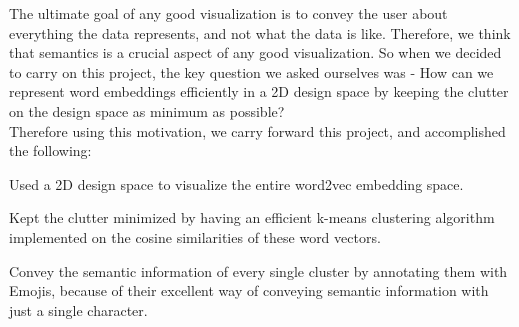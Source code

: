The ultimate goal of any good visualization is to convey the user about everything the data represents, and not what the data is like. Therefore, we think that semantics is a crucial aspect of any good visualization. So when we decided to carry on this project, the key question we asked ourselves was - How can we represent word embeddings efficiently in a 2D design space by keeping the clutter on the design space as minimum as possible? \\

Therefore using this motivation, we carry forward this project, and accomplished the following:
\begin{itemize*}
 \item Used a 2D design space to visualize the entire word2vec embedding space.
 \item Kept the clutter minimized by having an efficient k-means clustering algorithm implemented on the cosine similarities of these word vectors.
 \item Convey the semantic information of every single cluster by annotating them with Emojis, because of their excellent way of conveying semantic information with just a single character.
\end{itemize*}
